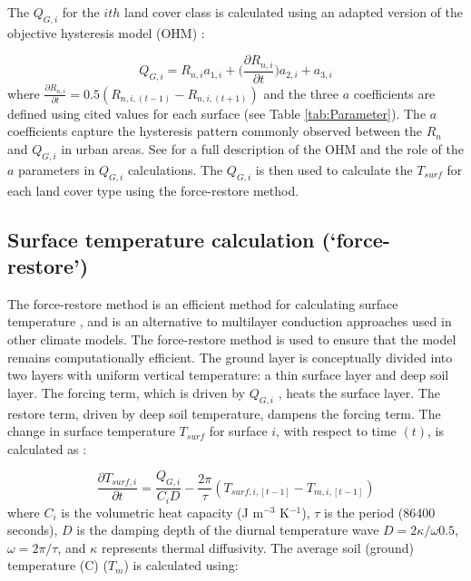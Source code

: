 \documentclass[journal abbreviation, manuscript]{copernicus}
\begin{document}
The \ensuremath{Q_{G,i}} for the $ith$ land cover class is calculated using an adapted version of the objective hysteresis model (OHM) \citep{Grimmond2002a}: 




\begin{equation} 
\ensuremath{Q_{G,i}} = R_{n,i} a_{1,i} + \Big( \frac{\partial R_{n,i}}{\partial t}   \Big) a_{2,i} + a_{3,i}
\label{eq:ohm} \end{equation} where  $\frac{\partial R_{n,i}}{\partial t} =0.5(R_{n,i,(t-1)} - R_{n,i,(t+1)})$ and the three $a$ coefficients  are defined using cited values for each surface (see Table \ref{tab:Parameter}). The $a$ coefficients capture the hysteresis pattern commonly observed between the \ensuremath{R_{n}} and \ensuremath{Q_{G,i}} in urban areas. See \cite{Grimmond1999b} for a full description of the OHM and the role of the $a$ parameters in \ensuremath{Q_{G,i}} calculations. The \ensuremath{Q_{G,i}}  is then used to calculate the $T_{surf}$ for each land cover type using the force-restore method.





\subsection{Surface temperature calculation (`force-restore')}\label{sec:tsurf}

 
The force-restore method is an efficient method for calculating surface temperature \citep{bhumralkar1975,deardorff1978}, and is an alternative to multilayer conduction approaches used in other climate models. The force-restore method is used to ensure that the model remains computationally efficient.  The ground layer is conceptually divided into two layers with uniform vertical temperature: a thin surface layer and deep soil layer. The forcing term, which is driven by \ensuremath{Q_{G,i}} , heats the surface layer. The restore term, driven by deep soil temperature, dampens the forcing term. The change in surface temperature $T_{surf}$ for surface $i$, with respect to time $(t)$, is calculated as \citep{jacobs2000}:


\begin{equation} 
\frac{\partial T_{surf,i}} {\partial t}= \frac{\ensuremath{Q_{G,i}}}{C_{i} D} - \frac{2 \pi}{\tau} (T_{surf,i,[t-1]} - T_{m,i,[t-1]})
\label{eq:force} \end{equation} where $C_{i}$ is the volumetric heat capacity (J m$^{-3}$ K$^{-1}$), $\tau$ is the period (86400 seconds), $D$ is the damping depth of the diurnal temperature wave $D = 2 \ensuremath{\kappa}  / \omega 0.5$, $\omega = 2\pi / \tau$, and \ensuremath{\kappa} represents thermal diffusivity.  The average soil (ground) temperature (\degree C) (\ensuremath{T_{m}}) is calculated using:
\end{document}
